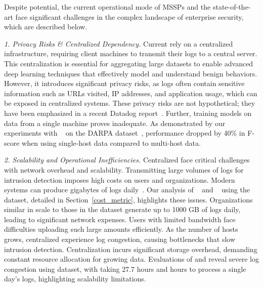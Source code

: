 \smallskip
{}
\smallskip

\noindent
Despite \pids potential, the current operational mode of MSSPs and the state-of-the-art \pids face significant challenges in the complex landscape of enterprise security, which are described below.


\noindent
\textit{1. Privacy Risks \& Centralized Dependency.} Current \pids rely on a centralized infrastructure, requiring client machines to transmit their logs to a central server. This centralization is essential for aggregating large datasets to enable advanced deep learning techniques that effectively model and understand benign behaviors. However, it introduces significant privacy risks, as logs often contain sensitive information such as URLs visited, IP addresses, and application usage, which can be exposed in centralized systems. These privacy risks are not hypothetical; they have been emphasized in a recent Datadog report~\cite{datadog}. Further, training models on data from a single machine proves inadequate. As demonstrated by our experiments with \flash~\cite{flash2024} on the DARPA \optc dataset~\cite{darpaoptc}, performance dropped by 40\% in F-score when using single-host data compared to multi-host data.

    
\smallskip
\noindent
\textit{2. Scalability and Operational Inefficiencies.}  Centralized \pids face critical challenges with network overhead and scalability. Transmitting large volumes of logs for intrusion detection imposes high costs on users and organizations. Modern systems can produce gigabytes of logs daily~\cite{inam2023sok,hossain+depend}. Our analysis of \flash~\cite{flash2024} and \kairos~\cite{cheng2023kairos} using the \optc dataset, detailed in Section~\ref{cost_metric}, highlights these issues. Organizations similar in scale to those in the \optc dataset generate up to 1000 GB of logs daily, leading to significant network expenses. Users with limited bandwidth face difficulties uploading such large amounts efficiently. As the number of hosts grows, centralized \pids experience log congestion, causing bottlenecks that slow intrusion detection. Centralization incurs significant storage overhead, demanding constant resource allocation for growing data. Evaluations of \flash and \kairos reveal severe log congestion using \optc dataset, with \flash taking 27.7 hours and  hours to process a single day's logs, highlighting scalability limitations.


